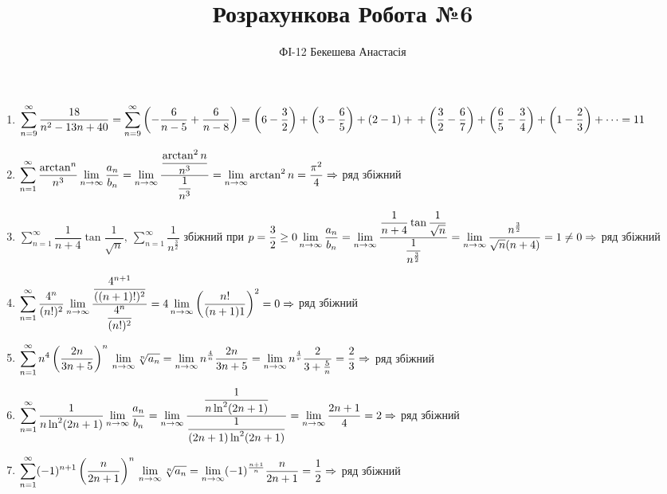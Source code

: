 \documentclass[a4paper,12pt]{article}
\newcommand{\dsum}{\displaystyle\sum}
\begin{document}
\title{Розрахункова Робота №6}
\author{ФІ-12 Бекешева Анастасія}
\maketitle
\newpage
\begin{enumerate}
	\item $\displaystyle\sum\limits_{n=9}^{\infty}\dfrac{18}{n^2-13n+40}=\displaystyle\sum\limits_{n=9}^{\infty}\left(-\dfrac6{n-5}+\dfrac6{n-8}\right)=\left(6-\dfrac32\right)+\left(3-\dfrac65\right)+(2-1)+\\+\left(\dfrac32-\dfrac67\right)+\left(\dfrac65-\dfrac34\right)+\left(1-\dfrac23\right)+\dots=11$
	\item $\dsum\limits_{n=1}^\infty\dfrac{\arctan^n}{n^3}\\\lim\limits_{n\to\infty}\dfrac{a_n}{b_n}=\lim\limits_{n\to\infty}\dfrac{\dfrac{\arctan^2n}{n^3}}{\dfrac1{n^3}}=\lim\limits_{n\to\infty}\arctan^2n=\dfrac{\pi^2}4\Rightarrow$ ряд збіжний
	\item $\dsum\limits_{n=1}^\infty\dfrac{1}{n+4}\tan\dfrac1{\sqrt n},\>\dsum\limits_{n=1}^\infty\dfrac{1}{n^\frac32}$ збіжний при $p=\dfrac32\geq0\\\lim\limits_{n\to\infty}\dfrac{a_n}{b_n}=\lim\limits_{n\to\infty}\dfrac{\dfrac1{n+4}\tan\dfrac1{\sqrt n}}{\dfrac1{n^\frac32}}=\lim\limits_{n\to\infty}\dfrac{n^{\frac32}}{\sqrt n(n+4)}=1\neq0\Rightarrow$ ряд збіжний
	\item $\dsum\limits_{n=1}^\infty\dfrac{4^n}{(n!)^2}\\\lim\limits_{n\to\infty}\dfrac{\dfrac{4^{n+1}}{((n+1)!)^2}}{\dfrac{4^n}{(n!)^2}}=4\lim\limits_{n\to\infty}\left(\dfrac{n!}{(n+1)1} \right)^2=0\Rightarrow$ ряд збіжний
	\item $\dsum\limits_{n=1}^\infty n^4\left(\dfrac{2n}{3n+5} \right)^n\\\lim\limits_{n\to\infty}\sqrt[n]{a_n}=\lim\limits_{n\to\infty}n^\frac4n\dfrac{2n}{3n+5}=\lim\limits_{n\to\infty}n^\frac4v\dfrac2{3+\frac5n}=\dfrac23\Rightarrow$ ряд збіжний
	\item $\dsum\limits_{n=1}^\infty\dfrac1{n\ln^2(2n+1)}\\\lim\limits_{n\to\infty}\dfrac{a_n}{b_n}=\lim\limits_{n\to\infty}\dfrac{\dfrac1{n\ln^2(2n+1)}}{\dfrac1{(2n+1)\ln^2(2n+1)}}=\lim\limits_{n\to\infty}\dfrac{2n+1}4=2\Rightarrow$ ряд збіжний
	\item $\dsum\limits_{n=1}^\infty(-1)^{n+1}\left(\dfrac n{2n+1}\right)^n\\\lim\limits_{n\to\infty}\sqrt[n]{a_n}=\lim\limits_{n\to\infty}(-1)^{\frac{n+1}n}\dfrac n{2n+1}=\dfrac12\Rightarrow$ ряд збіжний

\end{enumerate}
\end{document}
